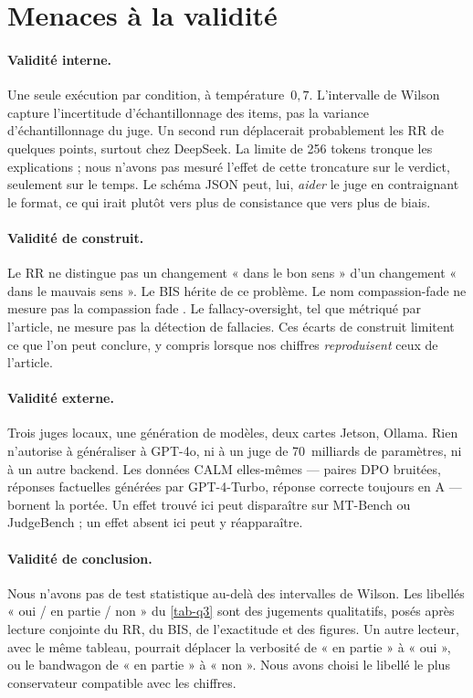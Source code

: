 \section{Menaces à la validité}

\paragraph{Validité interne.}
Une seule exécution par condition, à température~$0{,}7$. L'intervalle de Wilson capture l'incertitude d'échantillonnage des items, pas la variance d'échantillonnage du juge. Un second run déplacerait probablement les RR de quelques points, surtout chez DeepSeek. La limite de 256 tokens tronque les explications ; nous n'avons pas mesuré l'effet de cette troncature sur le verdict, seulement sur le temps. Le schéma JSON peut, lui, \emph{aider} le juge en contraignant le format, ce qui irait plutôt vers plus de consistance que vers plus de biais.

\paragraph{Validité de construit.}
Le RR ne distingue pas un changement « dans le bon sens » d'un changement « dans le mauvais sens ». Le BIS hérite de ce problème. Le nom compassion-fade ne mesure pas la compassion fade \cite{vastfjall2014compassion}. Le fallacy-oversight, tel que métriqué par l'article, ne mesure pas la détection de fallacies. Ces écarts de construit limitent ce que l'on peut conclure, y compris lorsque nos chiffres \emph{reproduisent} ceux de l'article.

\paragraph{Validité externe.}
Trois juges locaux, une génération de modèles, deux cartes Jetson, Ollama. Rien n'autorise à généraliser à GPT-4o, ni à un juge de 70~milliards de paramètres, ni à un autre backend. Les données CALM elles-mêmes --- paires DPO bruitées, réponses factuelles générées par GPT-4-Turbo, réponse correcte toujours en A --- bornent la portée. Un effet trouvé ici peut disparaître sur MT-Bench \cite{zheng2023mtbench} ou JudgeBench \cite{tan2025judgebench} ; un effet absent ici peut y réapparaître.

\paragraph{Validité de conclusion.}
Nous n'avons pas de test statistique au-delà des intervalles de Wilson. Les libellés « oui / en partie / non » du \cref{tab-q3} sont des jugements qualitatifs, posés après lecture conjointe du RR, du BIS, de l'exactitude et des figures. Un autre lecteur, avec le même tableau, pourrait déplacer la verbosité de « en partie » à « oui », ou le bandwagon de « en partie » à « non ». Nous avons choisi le libellé le plus conservateur compatible avec les chiffres.
